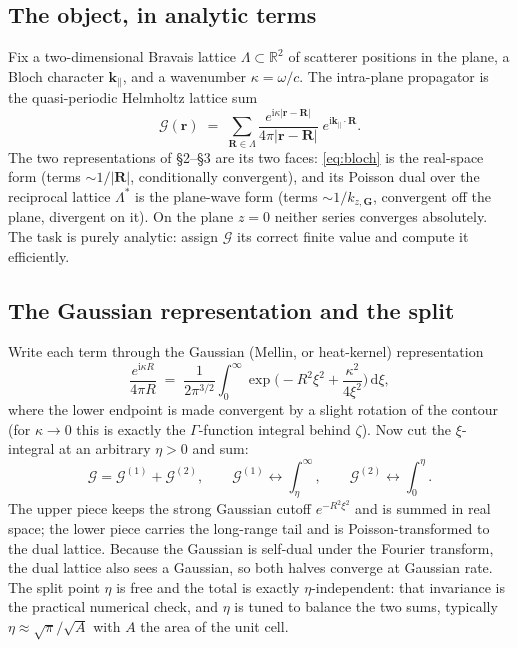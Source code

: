 \documentclass[11pt,a4paper]{article}
\newcommand{\rd}{\mathrm{d}}
\newcommand{\ii}{\mathrm{i}}
\newcommand{\kpar}{\mathbf{k}_{\parallel}}
\newcommand{\vr}{\mathbf{r}}
\newcommand{\vR}{\mathbf{R}}
\newcommand{\vG}{\mathbf{G}}
\newcommand{\Lat}{\Lambda}
\newcommand{\dLat}{\Lambda^{\ast}}
\newcommand{\kzG}{k_{z,\vG}}
\begin{document}
\subsection{The object, in analytic terms}

Fix a two-dimensional Bravais lattice $\Lat\subset\mathbb{R}^{2}$ of scatterer positions in
the plane, a Bloch character $\kpar$, and a wavenumber $\kappa=\omega/c$. The intra-plane
propagator is the quasi-periodic Helmholtz lattice sum
\begin{equation}
\label{eq:bloch}
\mathcal{G}(\vr)
\;=\;
\sum_{\vR\in\Lat}\frac{e^{\ii\kappa|\vr-\vR|}}{4\pi|\vr-\vR|}\;
e^{\ii\kpar\cdot\vR}.
\end{equation}
The two representations of \S2--\S3 are its two faces: \eqref{eq:bloch} is the real-space
form (terms $\sim 1/|\vR|$, conditionally convergent), and its Poisson dual over the
reciprocal lattice $\dLat$ is the plane-wave form (terms $\sim 1/\kzG$, convergent off the
plane, divergent on it). On the plane $z=0$ neither series converges absolutely. The task is
purely analytic: assign $\mathcal{G}$ its correct finite value and compute it efficiently.

\subsection{The Gaussian representation and the split}

Write each term through the Gaussian (Mellin, or heat-kernel) representation
\begin{equation}
\label{eq:gaussrep}
\frac{e^{\ii\kappa R}}{4\pi R}
\;=\;
\frac{1}{2\pi^{3/2}}\int_{0}^{\infty}
\exp\!\Big(-R^{2}\xi^{2}+\frac{\kappa^{2}}{4\xi^{2}}\Big)\,\rd\xi,
\end{equation}
where the lower endpoint is made convergent by a slight rotation of the contour (for
$\kappa\to 0$ this is exactly the $\Gamma$-function integral behind $\zeta$). Now cut the
$\xi$-integral at an arbitrary $\eta>0$ and sum:
\begin{equation}
\mathcal{G}=\mathcal{G}^{(1)}+\mathcal{G}^{(2)},
\qquad
\mathcal{G}^{(1)}\!\leftrightarrow\!\int_{\eta}^{\infty},
\qquad
\mathcal{G}^{(2)}\!\leftrightarrow\!\int_{0}^{\eta}.
\end{equation}
The upper piece keeps the strong Gaussian cutoff $e^{-R^{2}\xi^{2}}$ and is summed in real
space; the lower piece carries the long-range tail and is Poisson-transformed to the dual
lattice. Because the Gaussian is self-dual under the Fourier transform, the dual lattice also
sees a Gaussian, so both halves converge at Gaussian rate. The split point $\eta$ is free and
the total is exactly $\eta$-independent: that invariance is the practical numerical check, and
$\eta$ is tuned to balance the two sums, typically $\eta\approx\sqrt{\pi}/\sqrt{A}$ with $A$
the area of the unit cell.
\end{document}
